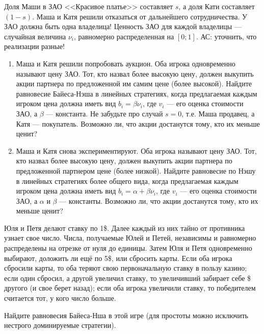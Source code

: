 \begin{problem}
Доля Маши в ЗАО <<Красивое платье>> составляет  $s$, а доля Кати составляет $\left(1-s\right)$. Маша и Катя решили отказаться от дальнейшего сотрудничества. У ЗАО должна быть одна владелица!
Ценность ЗАО для каждой владелицы --- случайная величина  $\nu _{i}$, равномерно распределенная на  $\left[0;1\right]$. {\red АС: уточнить, что реализации разные!}\par
\begin{enumerate}
\item	Маша и Катя решили попробовать аукцион. Оба игрока одновременно называют цену ЗАО. Тот, кто назвал более высокую цену, должен выкупить акции партнера по предложенной им самим цене (более высокой). Найдите равновесие Байеса-Нэша в линейных стратегиях, когда предлагаемая каждым игроком цена должна иметь вид  $b_{i} =\beta \nu _{i} $, где  $v_{i} $  --- его оценка стоимости ЗАО, а   $\beta $  --- константа. Не забудьте про случай  $s=0$, т.е. Маша продавец, а Катя --- покупатель. Возможно ли, что акции достанутся тому, кто их меньше ценит?\par
\item 	Маша и Катя снова экспериментируют. Оба игрока называют цену ЗАО. Тот, кто назвал более высокую цену, должен выкупить акции партнера по предложенной партнером цене (более низкой). Найдите равновесие по Нэшу в линейных стратегиях более общего вида, когда предлагаемая каждым игроком цена должна иметь вид  $b_{i} =\alpha +\beta \nu _{i} $, где  $v_{i} $  --- его оценка стоимости ЗАО, а  $\alpha $  и  $\beta $  --- константы. Возможно ли, что акции достанутся тому, кто их меньше ценит?\par
\end{enumerate}


\begin{sol}

\end{sol}
\end{problem}



\begin{problem}
Юля и Петя делают ставку по 1\$. Далее каждый из них тайно от противника узнает свое число. Числа, получаемые Юлей и Петей, независимы и равномерно распределены на отрезке от нуля до единицы. Затем Юля и Петя одновременно выбирают, доложить ли ещё по 5\$, или сбросить карты. Если оба игрока сбросили карты, то оба теряют свою первоначальную ставку в пользу казино; если один сбросил, а другой увеличил ставку, то увеличивший забирает себе {\$ другого (и свое берет назад)}; если оба игрока увеличили ставку, то победителем считается тот, у кого число больше.\par
Найдите равновесия Байеса-Нша в этой игре (для простоты можно исключить нестрого доминируемые стратегии).\par



\begin{sol}

\end{sol}
\end{problem}



